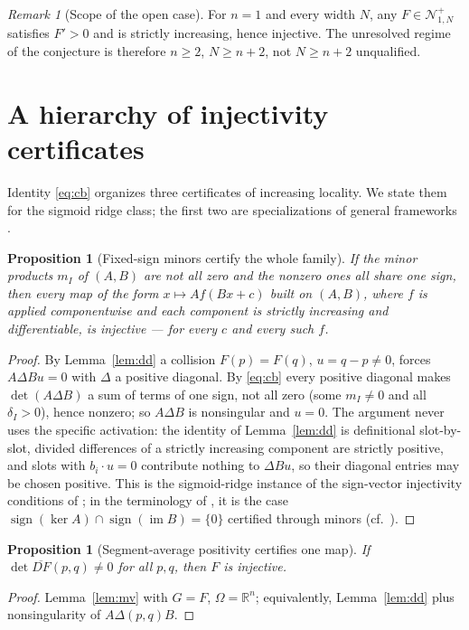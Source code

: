 \documentclass[11pt]{article}
\newtheorem{proposition}[theorem]{Proposition}
\theoremstyle{definition}
\theoremstyle{remark}
\newtheorem{remark}[theorem]{Remark}
\newcommand{\R}{\mathbb{R}}
\newcommand{\sgn}{\operatorname{sign}}
\begin{document}
\begin{remark}[Scope of the open case]
For $n=1$ and every width $N$, any $F\in\mathcal N^{+}_{1,N}$ satisfies
$F'>0$ and is strictly increasing, hence injective. The unresolved regime
of the conjecture is therefore $n\ge 2$, $N\ge n+2$, not $N\ge n+2$
unqualified.
\end{remark}

\section{A hierarchy of injectivity certificates}\label{sec:hierarchy}

Identity \eqref{eq:cb} organizes three certificates of increasing
locality. We state them for the sigmoid ridge class; the first two are
specializations of general frameworks
\cite{mhr,muelleretal,fmr}.

\begin{proposition}[Fixed-sign minors certify the whole family]
\label{prop:c1}
If the minor products $m_I$ of $(A,B)$ are not all zero and the nonzero
ones all share one sign, then
\emph{every} map of the form $x\mapsto Af(Bx+c)$ built on $(A,B)$, where
$f$ is applied componentwise and each component is strictly increasing
and differentiable, is injective --- for every $c$ and every such $f$.
\end{proposition}
\begin{proof}
By Lemma~\ref{lem:dd} a collision $F(p)=F(q)$, $u=q-p\ne0$, forces
$A\Delta Bu=0$ with $\Delta$ a positive diagonal. By \eqref{eq:cb} every
positive diagonal makes $\det(A\Delta B)$ a sum of terms of one sign, not
all zero (some $m_I\ne0$ and all $\delta_I>0$), hence nonzero; so
$A\Delta B$ is nonsingular and $u=0$. The argument never uses the specific
activation: the identity of Lemma~\ref{lem:dd} is definitional
slot-by-slot, divided differences of a strictly increasing component are
strictly positive, and slots with $b_i\cdot u=0$ contribute nothing to
$\Delta Bu$, so their diagonal entries may be chosen positive. This is the
sigmoid-ridge instance of the sign-vector injectivity conditions of
\cite{mhr,muelleretal}; in the terminology of \cite{mhr}, it is the case
$\sgn(\ker A)\cap\sgn(\operatorname{im}B)=\{0\}$ certified through minors
(cf.\ \cite[Cor.~4]{mhr}).
\end{proof}

\begin{proposition}[Segment-average positivity certifies one map]
\label{prop:c2}
If $\det\overline{DF}(p,q)\ne0$ for all $p,q$, then $F$ is injective.
\end{proposition}
\begin{proof}
Lemma~\ref{lem:mv} with $G=F$, $\Omega=\R^n$; equivalently,
Lemma~\ref{lem:dd} plus nonsingularity of $A\Delta(p,q)B$.
\end{proof}
\end{document}
